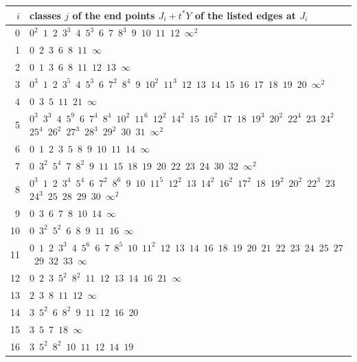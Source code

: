 \documentclass[11pt]{amsart}
\theoremstyle{definition}
\theoremstyle{remark}
\numberwithin{equation}{section}
\numberwithin{table}{section}
\numberwithin{figure}{section}
\begin{document}
\begin{table}[h]
\centering
\small
\renewcommand{\arraystretch}{1.12}
\begin{tabular}{@{}r p{}@{}}
\toprule
$i$ & classes $j$ of the end points $J_i+t^*Y$ of the listed edges at $J_i$\\
\midrule
0 & $0^{2}$\ $1$\ $2$\ $3^{3}$\ $4$\ $5^{3}$\ $6$\ $7$\ $8^{3}$\ $9$\ $10$\ $11$\ $12$\ $\infty^{2}$ \\
1 & $0$\ $2$\ $3$\ $6$\ $8$\ $11$\ $\infty$ \\
2 & $0$\ $1$\ $3$\ $6$\ $8$\ $11$\ $12$\ $13$\ $\infty$ \\
3 & $0^{3}$\ $1$\ $2$\ $3^{5}$\ $4$\ $5^{3}$\ $6$\ $7^{2}$\ $8^{4}$\ $9$\ $10^{2}$\ $11^{3}$\ $12$\ $13$\ $14$\ $15$\ $16$\ $17$\ $18$\ $19$\ $20$\ $\infty^{2}$ \\
4 & $0$\ $3$\ $5$\ $11$\ $21$\ $\infty$ \\
5 & $0^{3}$\ $3^{3}$\ $4$\ $5^{9}$\ $6$\ $7^{4}$\ $8^{4}$\ $10^{2}$\ $11^{6}$\ $12^{2}$\ $14^{2}$\ $15$\ $16^{2}$\ $17$\ $18$\ $19^{3}$\ $20^{2}$\ $22^{4}$\ $23$\ $24^{2}$\ $25^{4}$\ $26^{2}$\ $27^{3}$\ $28^{3}$\ $29^{2}$\ $30$\ $31$\ $\infty^{2}$ \\
6 & $0$\ $1$\ $2$\ $3$\ $5$\ $8$\ $9$\ $10$\ $11$\ $14$\ $\infty$ \\
7 & $0$\ $3^{2}$\ $5^{4}$\ $7$\ $8^{2}$\ $9$\ $11$\ $15$\ $18$\ $19$\ $20$\ $22$\ $23$\ $24$\ $30$\ $32$\ $\infty^{2}$ \\
8 & $0^{3}$\ $1$\ $2$\ $3^{4}$\ $5^{4}$\ $6$\ $7^{2}$\ $8^{6}$\ $9$\ $10$\ $11^{5}$\ $12^{2}$\ $13$\ $14^{2}$\ $16^{2}$\ $17^{2}$\ $18$\ $19^{2}$\ $20^{2}$\ $22^{3}$\ $23$\ $24^{3}$\ $25$\ $28$\ $29$\ $30$\ $\infty^{2}$ \\
9 & $0$\ $3$\ $6$\ $7$\ $8$\ $10$\ $14$\ $\infty$ \\
10 & $0$\ $3^{2}$\ $5^{2}$\ $6$\ $8$\ $9$\ $11$\ $16$\ $\infty$ \\
11 & $0$\ $1$\ $2$\ $3^{3}$\ $4$\ $5^{6}$\ $6$\ $7$\ $8^{5}$\ $10$\ $11^{2}$\ $12$\ $13$\ $14$\ $16$\ $18$\ $19$\ $20$\ $21$\ $22$\ $23$\ $24$\ $25$\ $27$\ $29$\ $32$\ $33$\ $\infty$ \\
12 & $0$\ $2$\ $3$\ $5^{2}$\ $8^{2}$\ $11$\ $12$\ $13$\ $14$\ $16$\ $21$\ $\infty$ \\
13 & $2$\ $3$\ $8$\ $11$\ $12$\ $\infty$ \\
14 & $3$\ $5^{2}$\ $6$\ $8^{2}$\ $9$\ $11$\ $12$\ $16$\ $20$ \\
15 & $3$\ $5$\ $7$\ $18$\ $\infty$ \\
16 & $3$\ $5^{2}$\ $8^{2}$\ $10$\ $11$\ $12$\ $14$\ $19$ \\

\end{tabular}
\end{table}
\end{document}
